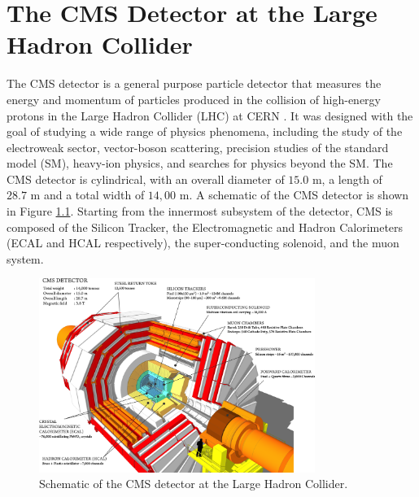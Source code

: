 \chapter{The CMS Detector at the Large Hadron Collider}

The CMS detector is a general purpose particle detector that measures the energy and momentum of particles produced in the collision of high-energy protons in the Large Hadron Collider (LHC) at CERN \cite{collaborationCMSExperimentCERN2008}. It was designed with the goal of studying a wide range of physics phenomena, including the study of the electroweak sector, vector-boson scattering, precision studies of the standard model (SM), heavy-ion physics, and searches for physics beyond the SM. The CMS detector is cylindrical, with an overall diameter of $15.0 \text{ m}$, a length of $28.7 \text{ m}$ and a total width of $14,00\text{ m}$. A schematic of the CMS detector is shown in Figure \ref{fig:cms_detector}. Starting from the innermost subsystem of the detector, CMS is composed of the Silicon Tracker, the Electromagnetic and Hadron Calorimeters (ECAL and HCAL respectively), the super-conducting solenoid, and the muon system.

\begin{figure}[ht]
	\centering
	\includegraphics[width=0.8\textwidth]{images/cms_detector.png}
	\caption{Schematic of the CMS detector at the Large Hadron Collider.}
	\label{fig:cms_detector}
\end{figure}



